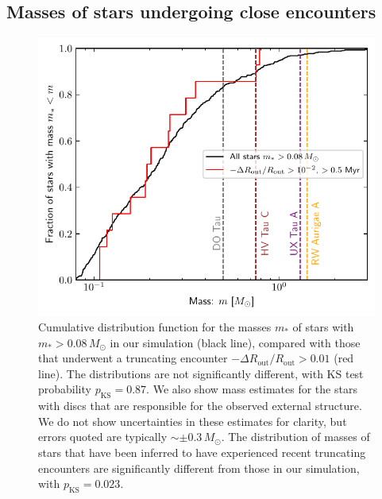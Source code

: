 \documentclass{aa}
\begin{document}
\subsection{Masses of stars undergoing close encounters}
\label{sec:encrate_mstar}
\begin{figure}
    \centering
    \includegraphics[width=\columnwidth]{Figures/mstar_encs.pdf}
    \caption{Cumulative distribution function for the masses $m_*$ of stars with $m_*>0.08\,M_\odot$ in our simulation (black line), compared with those that underwent a truncating encounter $-\Delta R_\mathrm{out}/R_\mathrm{out}>0.01$ (red line). The  distributions are not significantly different, with KS test probability $p_\mathrm{KS} =0.87$.  We also show mass estimates for the stars with discs that are responsible for the observed external structure. We do not show uncertainties in these estimates for clarity, but errors quoted are typically $\sim \pm 0.3 \, M_\odot$. The distribution of masses of stars that have been inferred to have experienced recent truncating encounters are significantly different from those in our simulation, with $p_\mathrm{KS} =0.023$.}
    \label{fig:mstar_enc}
\end{figure}
\end{document}
